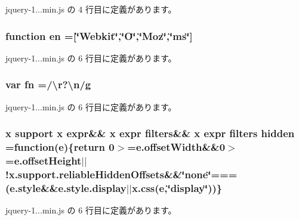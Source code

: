  jquery-\/1...\+min.\+js の 4 行目に定義があります。

\hypertarget{jquery-1_810_82_8min_8js_a5d7a777130eac935addcf4926a74b23c}{}
\subsubsection[{en}]{\setlength{\rightskip}{0pt plus 5cm}function en =\mbox{[}\char`\"{}Webkit\char`\"{},\char`\"{}O\char`\"{},\char`\"{}Moz\char`\"{},\char`\"{}ms\char`\"{}\mbox{]}}\label{jquery-1_810_82_8min_8js_a5d7a777130eac935addcf4926a74b23c}


 jquery-\/1...\+min.\+js の 6 行目に定義があります。

\hypertarget{jquery-1_810_82_8min_8js_a37b9e1ceee4c6d2616fa6081784b5468}{}
\subsubsection[{fn}]{\setlength{\rightskip}{0pt plus 5cm}var fn =/\textbackslash{}r?\textbackslash{}n/g}\label{jquery-1_810_82_8min_8js_a37b9e1ceee4c6d2616fa6081784b5468}


 jquery-\/1...\+min.\+js の 6 行目に定義があります。

\hypertarget{jquery-1_810_82_8min_8js_a086b6295ec8d15f090cd7239137a4979}{}
\subsubsection[{hidden}]{ {\bf x} support {\bf x} expr\&\& {\bf x} expr filters\&\& {\bf x} expr filters hidden =function({\bf e})\{return 0$>$=e.\+offset\+Width\&\&0$>$=e.\+offset\+Height$\vert$$\vert$!x.\+support.\+reliable\+Hidden\+Offsets\&\&\char`\"{}none\char`\"{}===(e.\+style\&\&e.\+style.\+display$\vert$$\vert$x.\+css({\bf e},\char`\"{}display\char`\"{}))\}}\label{jquery-1_810_82_8min_8js_a086b6295ec8d15f090cd7239137a4979}


 jquery-\/1...\+min.\+js の 6 行目に定義があります。

